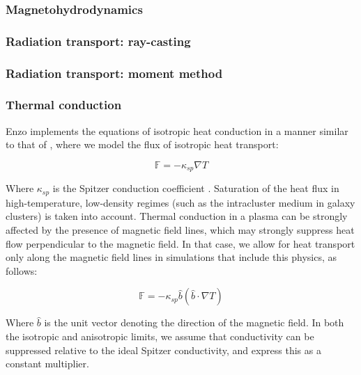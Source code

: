 
\subsubsection{Magnetohydrodynamics}



\subsubsection{Radiation transport: ray-casting}



\subsubsection{Radiation transport: moment method}



\subsubsection{Thermal conduction}

Enzo implements the equations of isotropic heat conduction in a manner
similar to that of \citet{2007ApJ...664..135P}, where we model the
flux of isotropic heat transport:

\begin{equation}
\mathbb{F} = -\kappa_{sp} \nabla T
\end{equation}

Where $\kappa_{sp}$ is the Spitzer conduction coefficient
\citep{1962pfig.book.....S}.  Saturation of the heat flux in
high-temperature, low-density regimes (such as the intracluster medium
in galaxy clusters) is taken into account.  Thermal conduction in a
plasma can be strongly affected by the presence of magnetic field
lines, which may strongly suppress heat flow perpendicular to the
magnetic field.  In that case, we allow for heat transport only along
the magnetic field lines in simulations that include this physics, as follows:

\begin{equation}
\mathbb{F} = -\kappa_{sp} \hat{b} (\hat{b} \cdot \nabla T)
\end{equation}

Where $\hat{b}$ is the unit vector denoting the direction of the
magnetic field.  In both the isotropic and anisotropic limits, we
assume that conductivity can be suppressed relative to the ideal
Spitzer conductivity, and express this as a constant multiplier.


